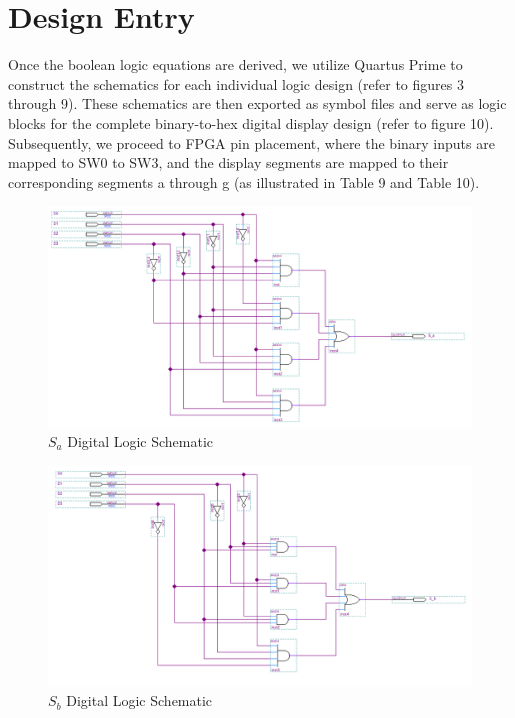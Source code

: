 \documentclass{article}
\begin{document}
\section*{\textcolor{mycolor}{Design Entry}}
Once the boolean logic equations are derived, we utilize Quartus Prime to construct the schematics for each individual logic design (refer to figures 3 through 9). These schematics are then exported as symbol files and serve as logic blocks for the complete binary-to-hex digital display design (refer to figure 10). Subsequently, we proceed to FPGA pin placement, where the binary inputs are mapped to SW0 to SW3, and the display segments are mapped to their corresponding segments a through g (as illustrated in Table 9 and Table 10).
\begin{figure}[H]
  \centering
  \includegraphics[width=1\textwidth]{S_a_schem.png}
  \caption{$S_a$ Digital Logic Schematic}
\end{figure}

\begin{figure}[H]
  \centering
  \includegraphics[width=1\textwidth]{S_b_schem.png}
  \caption{$S_b$ Digital Logic Schematic}
\end{figure}
\end{document}
